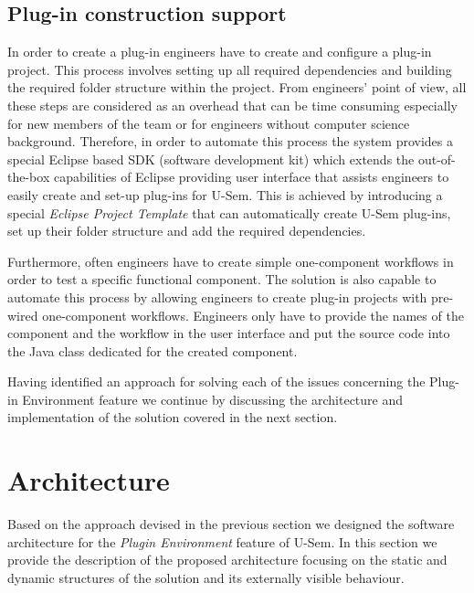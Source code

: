 \subsection{Plug-in construction support}

In order to create a plug-in engineers have to create and configure a plug-in project. This process involves setting up all required dependencies and building the required folder structure within the project. From engineers' point of view, all these steps are considered as an overhead that can be time consuming especially for new members of the team or for engineers without computer science background. Therefore, in order to automate this process the system provides a special Eclipse based SDK (software development kit) which extends the out-of-the-box capabilities of Eclipse providing user interface that assists engineers to easily create and set-up plug-ins for U-Sem. This is achieved by introducing a special \textit{Eclipse Project Template} \cite{silva2009practical} that can automatically create U-Sem plug-ins, set up their folder structure and add the required dependencies.
 
Furthermore, often engineers have to create simple one-component workflows in order to test a specific functional component. The solution is also capable to automate this process by allowing engineers to create plug-in projects with pre-wired one-component workflows. Engineers only have to provide the names of the component and the workflow in the user interface and put the source code into the Java class dedicated for the created component. 

Having identified an approach for solving each of the issues concerning the Plug-in Environment feature we continue by discussing the architecture and implementation of the solution covered in the next section. 

\section{Architecture}
\label{sec:architecturePlugin}

Based on the approach devised in the previous section we designed the software architecture for the \textit{Plugin Environment} feature of U-Sem. In this section we provide the description of the proposed architecture focusing on the static and dynamic structures of the solution and its externally visible behaviour.

